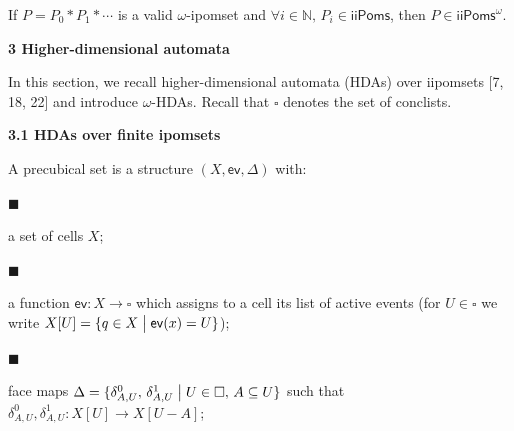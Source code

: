 \documentclass[10pt,a4paper]{article}
\begin{document}
 
If $P=P_{0}*P_{1}*\cdots$ is a valid $\omega$-ipomset and $\forall i\in\mathbb{N},\,P_{i}\in\mathsf{iiPoms}$, then $P\in{\mathsf{iiPoms}^{\omega}}$.\par
 
 
 
 
 


 
\par\medskip\noindent\textbf{3 Higher-dimensional automata}\par
 
 
In this section, we recall higher-dimensional automata (HDAs) over iipomsets [7, 18, 22] and introduce $\omega$-HDAs. Recall that $\square$ denotes the set of conclists.\par
 
 
 
\par\medskip\noindent\textbf{3.1 HDAs over finite ipomsets}\par
 
 
A precubical set is a structure $(X,\mathsf{ev},\Delta)$ with:\par
  
\par\noindent  $\blacksquare$ 
 
a set of cells $X$;\par
 
 
 
\par\noindent  $\blacksquare$ 
 
a function $\mathsf{ev}:X\rightarrow\square$ which assigns to a cell its list of active events (for $U\in\square$ we write $X[U]={\{q\in X\mathrel{\big{|}}\mathsf{ev}(x)=U\}}$);\par
 
 
 
\par\noindent  $\blacksquare$ 
 
face maps $\Delta={\{\delta_{A,U}^{0},\,\delta_{A,U}^{1}\mathrel{\big{|}}U\in\square,\,A\subseteq U\}}$ such that $\delta_{A,U}^{0},\delta_{A,U}^{1}:X[U]\rightarrow X[U-A]$;\par
 
\end{document}
